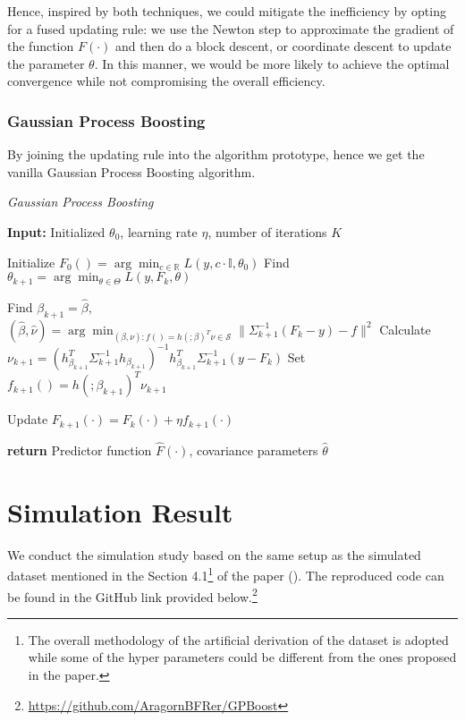 \documentclass[12pt,a4paper]{article}
\begin{document}
Hence, inspired by both techniques, we could mitigate the inefficiency by opting for a fused updating rule: we use the Newton step to approximate the gradient of the function $F(\cdot)$ and then do a block descent, or coordinate descent to update the parameter $\theta$. In this manner, we would be more likely to achieve the optimal convergence while not compromising the overall efficiency. 


\subsubsection{Gaussian Process Boosting}

By joining the updating rule into the algorithm prototype, hence we get the vanilla Gaussian Process Boosting algorithm.

\begin{algorithm}
\caption{\textit{Gaussian Process Boosting}}\label{alg:vanilla_GPBoost}
\begin{algorithmic}[1]
\State \textbf{Input:} Initialized $\theta_0$, learning rate $\eta$, number of iterations $K$

\State Initialize $F_0() = \arg\min_{c \in \mathbb{R}} L(y, c\cdot \mathbb{I}, \theta_0)$
    \State Find $\theta_{k+1} = \arg\min_{\theta \in \Theta} L(y, F_{k}, \theta)$
    
    \State Find $\beta_{k+1} = \hat{\beta}$, $(\hat{\beta}, \hat{\nu}) = \arg\min_{(\beta, \nu): f() = h(;\beta)^T \nu \in \mathcal{S}} \| \Sigma_{k+1}^{-1} (F_{k} - y) - f \|^2$
    \State Calculate $\nu_{k+1} = (h_{\beta_{k+1}}^T \Sigma_{k+1}^{-1} h_{\beta_{k+1}})^{-1} h_{\beta_{k+1}}^T \Sigma_{k+1}^{-1} (y - F_{k})$
    \State Set $f_{k+1}() = h(;\beta_{k+1})^T \nu_{k+1}$
    
    \State Update $F_{k+1}(\cdot) = F_{k}(\cdot) + \eta f_{k+1}(\cdot)$
\EndFor

\State \textbf{return} Predictor function $\hat{F}(\cdot)$, covariance parameters $\hat{\theta}$
\end{algorithmic}
\end{algorithm}


\section{Simulation Result\label{sec2}}
We conduct the simulation study based on the same setup as the simulated dataset mentioned in the Section 4.1\footnote{The overall methodology of the artificial derivation of the dataset is adopted while some of the hyper parameters could be different from the ones proposed in the paper.} of the paper (\cite{Sigrist2022}). The reproduced code can be found in the GitHub link provided below.\footnote{\url{https://github.com/AragornBFRer/GPBoost}}
\end{document}
